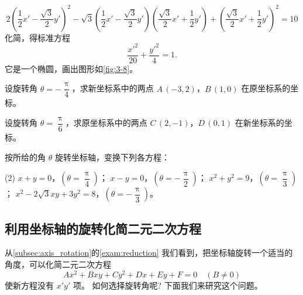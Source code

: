 \medskip
\[2\left(\frac{1}{2}x'-\frac{\sqrt{3}}{2}y'\right)^2-\sqrt{3}\left(\frac{1}{2}x'-\frac{\sqrt{3}}{2}y'\right)\left(\frac{\sqrt{3}}{2}x'+\frac{1}{2}y'\right)+\left(\frac{\sqrt{3}}{2}x'+\frac{1}{2}y'\right)^2=10
  \]
  化简，得标准方程
  \[ \frac{x'^2}{20}+\frac{y'^2}{4}=1.\]
  它是一个椭圆，画出图形如\cref{fig:3-8}。

\begin{Practice}
  \begin{question}
    \item 设旋转角 $\theta=-\dfrac{\uppi}{4}$，求新坐标系中的两点 $A\,(-3,2)$，$B\,(1,0)$ 在原坐标系的坐标。
    \item 设旋转角 $\theta=\dfrac{\uppi}{6}$，求原坐标系中的两点 $C\,(2,-1)$，$D\,(0,1)$ 在新坐标系的坐标。
    \item 按所给的角 $\theta$ 旋转坐标轴，变换下列各方程：
    \begin{tasks}(2)
      \task $x+y=0$，$\left(\theta=\dfrac{\uppi}{4}\right)$；
      \task $x-y=0$，$\left(\theta=-\dfrac{\uppi}{2}\right)$；
      \task $x^2+y^2=9$，$\left(\theta=\dfrac{\uppi}{3}\right)$；
      \task $x^2-2\sqrt{3}{xy}+3y^2=8$，$\left(\theta=-\dfrac{\uppi}{3}\right)$。
    \end{tasks}
  \end{question}
\end{Practice}

\subsection{利用坐标轴的旋转化简二元二次方程}\label{subsec:axis_rotation_reduction}
从\cref{subsec:axis_rotation}的\cref{exam:reduction} 我们看到，把坐标轴旋转一个适当的角度，可以化简二元二次方程
\begin{equation}
  \label{eq:general_power_2}
  Ax^2+Bxy+Cy^2+Dx+Ey+F=0\quad(B\neq 0)
\end{equation}
使新方程没有 $x'y'$ 项。
如何选择旋转角呢? 下面我们来研究这个问题。

